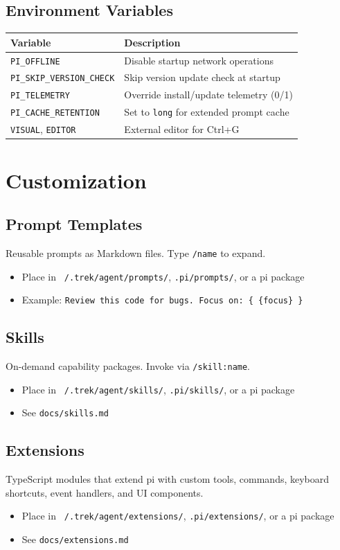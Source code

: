 \documentclass[12pt]{article}
\begin{document}
\subsection*{Environment Variables}
\begin{tabular}{@{}ll@{}}
\toprule
\textbf{Variable} & \textbf{Description} \\
\midrule
\texttt{PI\_OFFLINE} & Disable startup network operations \\
\texttt{PI\_SKIP\_VERSION\_CHECK} & Skip version update check at startup \\
\texttt{PI\_TELEMETRY} & Override install/update telemetry (0/1) \\
\texttt{PI\_CACHE\_RETENTION} & Set to \texttt{long} for extended prompt cache \\
\texttt{VISUAL}, \texttt{EDITOR} & External editor for Ctrl+G \\
\bottomrule
\end{tabular}

\section{Customization}

\subsection*{Prompt Templates}
Reusable prompts as Markdown files. Type \texttt{/name} to expand.
\begin{itemize}
    \item Place in \texttt{~/.trek/agent/prompts/}, \texttt{.pi/prompts/}, or a pi package
    \item Example: \texttt{Review this code for bugs. Focus on: \{ \{focus\} \}}
\end{itemize}

\subsection*{Skills}
On-demand capability packages. Invoke via \texttt{/skill:name}.
\begin{itemize}
    \item Place in \texttt{~/.trek/agent/skills/}, \texttt{.pi/skills/}, or a pi package
    \item See \texttt{docs/skills.md}
\end{itemize}

\subsection*{Extensions}
TypeScript modules that extend pi with custom tools, commands, keyboard shortcuts, event handlers, and UI components.
\begin{itemize}
    \item Place in \texttt{~/.trek/agent/extensions/}, \texttt{.pi/extensions/}, or a pi package
    \item See \texttt{docs/extensions.md}
\end{itemize}
\end{document}
